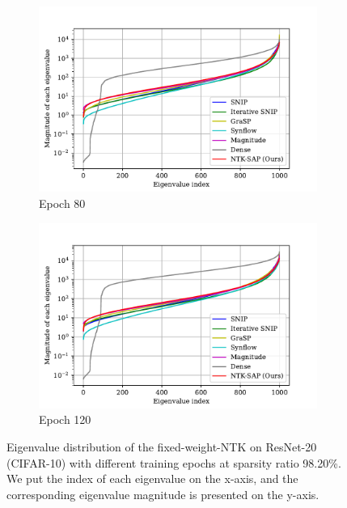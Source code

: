 \documentclass{article} %
\begin{document}
\begin{figure}
  \begin{subfigure}[b]{.49\textwidth}
    \includegraphics[width=\textwidth]{plots/ICLR_rebuttal/compare_w_dense_abs_epoch80.pdf}
   \caption{\small Epoch 80}
   \label{fig:appendix-eig-during-epoch80}
  \end{subfigure}
   \begin{subfigure}[b]{.49\textwidth}
        \includegraphics[width=\textwidth]{plots/ICLR_rebuttal/compare_w_dense_abs_epoch120.pdf}
   \caption{\small Epoch 120}
   \label{fig:appendix-eig-during-epoch120}
  \end{subfigure}
    \caption{Eigenvalue distribution of the fixed-weight-NTK on ResNet-20 (CIFAR-10) with different training epochs at sparsity ratio 98.20\%. We put the index of each eigenvalue on the x-axis, and the corresponding eigenvalue magnitude is presented on the y-axis.
    }
    \label{fig:appendix-eig-during-epoch}
\end{figure}
\end{document}
